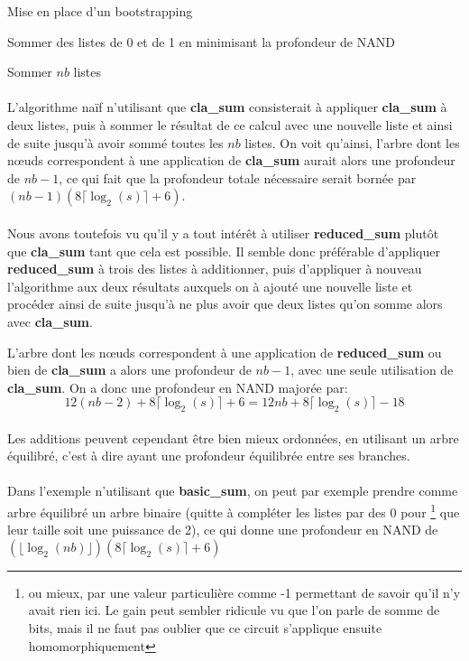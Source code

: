 \begin{section}{Mise en place d'un bootstrapping}
\begin{subsection}{Sommer des listes de 0 et de 1 en minimisant la profondeur de NAND}
\begin{subsubsection}{Sommer $nb$ listes}
\paragraph{}
L'algorithme naïf n'utilisant que \textbf{cla\_sum} consisterait à appliquer
\textbf{cla\_sum} à deux listes, puis à sommer le résultat de ce calcul avec une nouvelle liste et ainsi de suite jusqu'à avoir sommé toutes les $nb$ listes.
On voit qu'ainsi, l'arbre dont les n\oe{}uds correspondent à une application de \textbf{cla\_sum}
aurait alors une profondeur de $nb - 1$, ce qui fait que la profondeur totale nécessaire serait 
bornée par $(nb-1)(8\lceil\log_2(s)\rceil + 6)$.

\paragraph{}
Nous avons toutefois vu qu'il y a tout intérêt à utiliser \textbf{reduced\_sum}
plutôt que \textbf{cla\_sum} tant que cela est possible.
Il semble donc préférable d'appliquer \textbf{reduced\_sum} à trois des listes à additionner,
puis d'appliquer à nouveau l'algorithme aux deux résultats auxquels on à ajouté une nouvelle liste et 
procéder ainsi de suite jusqu'à ne plus avoir que deux listes qu'on somme alors avec \textbf{cla\_sum}.

L'arbre dont les n\oe{}uds correspondent à une application de \textbf{reduced\_sum}
ou bien de \textbf{cla\_sum} a alors une profondeur de $nb - 1$, avec une seule utilisation de \textbf{cla\_sum}. On a donc une profondeur en NAND majorée par:
\[ 12(nb - 2) + 8 \lceil \log_2(s) \rceil + 6 = 12 nb + 8 \lceil \log_2(s) \rceil - 18\]
	
\paragraph{}
Les additions peuvent cependant être bien mieux ordonnées, en utilisant 
un arbre équilibré, c'est à dire ayant une profondeur équilibrée entre ses branches.

\paragraph{}
Dans l'exemple n'utilisant que \textbf{basic\_sum}, on peut par exemple prendre 
comme arbre équilibré un arbre binaire (quitte à compléter les listes par des $0$ pour
\footnote{ou mieux, par une valeur particulière comme -1 permettant de savoir qu'il n'y avait rien ici. Le gain peut 
sembler ridicule vu que l'on parle de somme de bits, mais il ne faut pas oublier que ce circuit s'applique 
ensuite homomorphiquement} que leur taille
soit une puissance de 2), ce qui donne une profondeur en NAND de   
$(\lfloor \log_2(nb) \rfloor)(8\lceil\log_2(s)\rceil + 6)$


\end{subsubsection}
\end{subsection}
\end{section}
